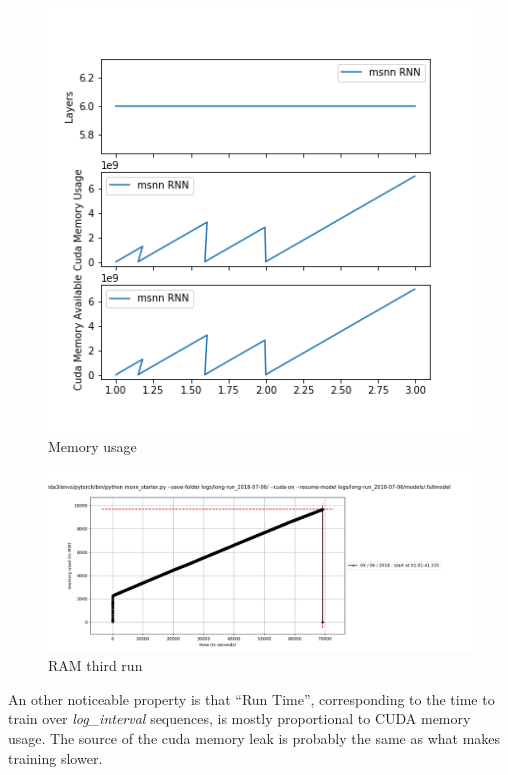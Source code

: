 \begin{figure}[H]
\centering
\includegraphics{parts/appendix/reports-gmsnn/docs_esteban-latex/test_reports/2018-06-11/memory.png}
\caption{Memory usage}
\end{figure}

\begin{figure}[H]
\centering
\includegraphics[width=\textwidth]{parts/appendix/reports-gmsnn/docs_esteban-latex/test_reports/2018-06-11/RAM_restart-2.png}
\caption{RAM third run}
\end{figure}

An other noticeable property is that ``Run Time'', corresponding to the
time to train over \emph{log\_interval} sequences, is mostly
proportional to CUDA memory usage. The source of the cuda memory leak is
probably the same as what makes training slower.

